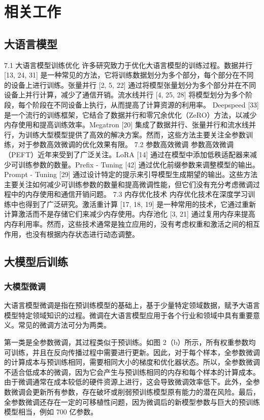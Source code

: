 \chapter{相关工作}

\section{大语言模型}
7.1 大语言模型训练优化
许多研究致力于优化大语言模型的训练过程。数据并行 [13, 24, 31] 是一种常见的方法，它将训练数据划分为多个部分，每个部分在不同的设备上进行训练。张量并行 [2, 5, 22] 通过将模型张量划分为多个部分并在不同设备上并行计算，减少了通信开销。流水线并行 [4, 25, 28] 将模型划分为多个阶段，每个阶段在不同设备上执行，从而提高了计算资源的利用率。
Deepspeed [33] 是一个流行的训练框架，它结合了数据并行和零冗余优化（ZeRO）方法，以减少内存使用和提高训练效率。Megatron [20] 集成了数据并行、张量并行和流水线并行，为训练大型模型提供了高效的解决方案。然而，这些方法主要关注全参数训练，对于参数高效微调的优化效果有限。
7.2 参数高效微调
参数高效微调（PEFT）近年来受到了广泛关注。LoRA [14] 通过在模型中添加低秩适配器来减少可训练参数的数量。Prefix - Tuning [42] 通过优化前缀参数来调整模型的输出。Prompt - Tuning [29] 通过设计特定的提示来引导模型生成期望的输出。这些方法主要关注如何减少可训练参数的数量和提高微调性能，但它们没有充分考虑微调过程中的内存使用和通信开销问题。
7.3 内存优化技术
内存优化技术在深度学习训练中也得到了广泛研究。激活重计算 [17, 18, 19] 是一种常用的技术，它通过重新计算激活而不是存储它们来减少内存使用。内存池化 [3, 21] 通过复用内存来提高内存利用率。然而，这些技术通常是独立应用的，没有考虑权重和激活之间的相互作用，也没有根据内存状态进行动态调整。


\section{大模型后训练}

\subsection{大模型微调}

大语言模型微调是指在预训练模型的基础上，基于少量特定领域数据，赋予大语言模型特定领域知识的过程。微调在大语言模型应用于各个行业和领域中具有重要意义。常见的微调方法可分为两类。

第一类是全参数微调，其过程类似于预训练。如图 2（b）所示，所有权重参数均可训练，并且在反向传播过程中需要进行更新。因此，对于每个样本，全参数微调的计算成本与预训练相同，需要相同大小的梯度和优化器状态。所以，全参数微调不适合低成本的微调，因为它会产生与预训练相同的内存和每个样本的计算成本。由于微调通常在成本较低的硬件资源上进行，这会导致微调效率低下。此外，全参数微调会更新所有参数，存在破坏或削弱预训练模型原有能力的潜在风险。最后，全参数微调还存在一定的可移植性问题，因为微调后的新模型参数与巨大的预训练模型相当，例如 700 亿参数。

